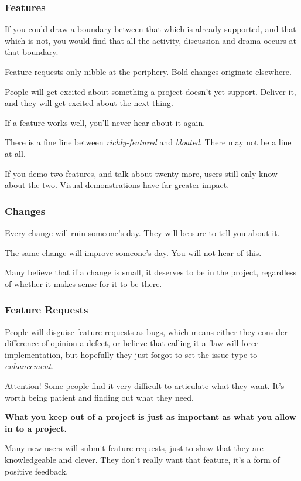 \documentclass[t,handout]{beamer}
\begin{document}
\begin{frame}[fragile]\frametitle{Features}
    If you could draw a boundary between that which is already supported, and that which is not, you would find that all the activity, discussion and drama occurs at that boundary.

    Feature requests only nibble at the periphery. Bold changes originate elsewhere.

    People will get excited about something a project doesn't yet support. Deliver it, and they will get excited about the next thing.

    If a feature works well, you’ll never hear about it again.

    There is a fine line between \textit{richly-featured} and \textit{bloated}. There may not be a line at all.

    If you demo two features, and talk about twenty more, users still only know about the two. Visual demonstrations have far greater impact.
\end{frame}

\begin{frame}[fragile]\frametitle{Changes}
    Every change will ruin someone’s day. They will be sure to tell you about it.

    The same change will improve someone's day. You will not hear of this.

    Many believe that if a change is small, it deserves to be in the project, regardless of whether it makes sense for it to be there.
\end{frame}

\begin{frame}[fragile]\frametitle{Feature Requests}
    People will disguise feature requests as bugs, which means either they consider difference of opinion a defect, or believe that calling it a flaw will force implementation, but hopefully they just forgot to set the issue type to \textit{enhancement}.

    \begin{alertblock}{Attention!}
        Some people find it very difficult to articulate what they want. It's worth being patient and finding out what they need.
    \end{alertblock}

    \textbf{What you keep out of a project is just as important as what you allow in to a project.}

    Many new users will submit feature requests, just to show that they are knowledgeable and clever. They don't really want that feature, it's a form of positive feedback.
\end{frame}
\end{document}
